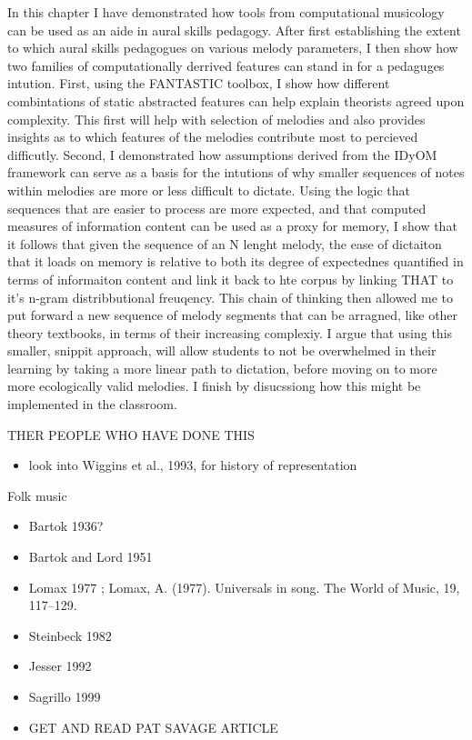 \documentclass[]{book}
\providecommand{\tightlist}{%
  \setlength{\itemsep}{0pt}\setlength{\parskip}{0pt}}
\begin{document}
In this chapter I have demonstrated how tools from computational musicology can be used as an aide in aural skills pedagogy.
After first establishing the extent to which aural skills pedagogues on various melody parameters, I then show how two families of computationally derrived features can stand in for a pedaguges intution.
First, using the FANTASTIC toolbox, I show how different combintations of static abstracted features can help explain theorists agreed upon complexity.
This first will help with selection of melodies and also provides insights as to which features of the melodies contribute most to percieved difficutly.
Second, I demonstrated how assumptions derived from the IDyOM framework can serve as a basis for the intutions of why smaller sequences of notes within melodies are more or less difficult to dictate.
Using the logic that sequences that are easier to process are more expected, and that computed measures of information content can be used as a proxy for memory, I show that it follows that given the sequence of an N lenght melody, the ease of dictaiton that it loads on memory is relative to both its degree of expectednes quantified in terms of informaiton content and link it back to hte corpus by linking THAT to it's n-gram distribbutional freuqency.
This chain of thinking then allowed me to put forward a new sequence of melody segments that can be arragned, like other theory textbooks, in terms of their increasing complexiy.
I argue that using this smaller, snippit approach, will allow students to not be overwhelmed in their learning by taking a more linear path to dictation, before moving on to more more ecologically valid melodies.
I finish by disucssiong how this might be implemented in the classroom.

THER PEOPLE WHO HAVE DONE THIS

\begin{itemize}
\tightlist
\item
  look into Wiggins et al., 1993, for history of representation
\end{itemize}

Folk music

\begin{itemize}
\item
  Bartok 1936?
\item
  Bartok and Lord 1951
\item
  Lomax 1977 ; Lomax, A. (1977). Universals in song. The World of Music, 19, 117--129.
\item
  Steinbeck 1982
\item
  Jesser 1992
\item
  Sagrillo 1999
\item
  GET AND READ PAT SAVAGE ARTICLE
\end{itemize}
\end{document}
